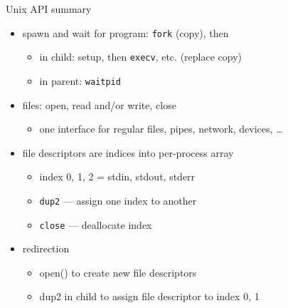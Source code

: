 \begin{frame}{Unix API summary}
    \begin{itemize}
    \item spawn and wait for program: \texttt{fork} (copy), then
        \begin{itemize}
        \item in child: setup, then \texttt{execv}, etc. (replace copy)
        \item in parent: \texttt{waitpid}
        \end{itemize}
    \item files: open, read and/or write, close
        \begin{itemize}
        \item one interface for regular files, pipes, network, devices, \ldots
        \end{itemize}
    \item file descriptors are indices into per-process array
        \begin{itemize}
        \item index 0, 1, 2 = stdin, stdout, stderr
        \item \texttt{dup2} --- assign one index to another
        \item \texttt{close} --- deallocate index
        \end{itemize}
    \item redirection
        \begin{itemize}
        \item open() to create new file descriptors
        \item dup2 in child to assign file descriptor to index 0, 1
        \end{itemize}
    \end{itemize}
\end{frame}
